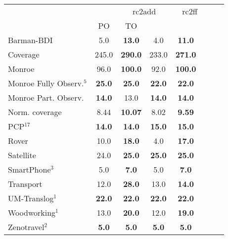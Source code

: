 \begin{tabular}{lccccccl} 
\toprule 
  && \multicolumn{2}{c}{rc2add} & \multicolumn{2}{c}{rc2ff} \\ 
\cmidrule(lr){3-4} \cmidrule(lr){5-6}  
 &PO & TO  \\ 
\midrule 
Barman-BDI & 5.0 & \textbf{13.0} & 4.0 & \textbf{11.0}  \\ 
\midrule 
 Coverage & 245.0 & \textbf{290.0} & 233.0 & \textbf{271.0}  \\ 
\midrule 
 Monroe & 96.0 & \textbf{100.0} & 92.0 & \textbf{100.0}  \\ 
Monroe Fully Observ.$^{5}$ & \textbf{25.0} & \textbf{25.0} & \textbf{22.0} & \textbf{22.0}  \\ 
Monroe Part. Observ. & \textbf{14.0} & 13.0 & \textbf{14.0} & \textbf{14.0}  \\ 
Norm. coverage & 8.44 & \textbf{10.07} & 8.02 & \textbf{9.59}  \\ 
PCP$^{17}$ & \textbf{14.0} & \textbf{14.0} & \textbf{15.0} & \textbf{15.0}  \\ 
Rover & 10.0 & \textbf{18.0} & 4.0 & \textbf{17.0}  \\ 
Satellite & 24.0 & \textbf{25.0} & \textbf{25.0} & \textbf{25.0}  \\ 
SmartPhone$^{3}$ & 5.0 & \textbf{7.0} & 5.0 & \textbf{7.0}  \\ 
Transport & 12.0 & \textbf{28.0} & 13.0 & \textbf{14.0}  \\ 
UM-Translog$^{1}$ & \textbf{22.0} & \textbf{22.0} & \textbf{22.0} & \textbf{22.0}  \\ 
Woodworking$^{1}$ & 13.0 & \textbf{20.0} & 12.0 & \textbf{19.0}  \\ 
Zenotravel$^{2}$ & \textbf{5.0} & \textbf{5.0} & \textbf{5.0} & \textbf{5.0}  \\ 
\bottomrule 
 \end{tabular} 
